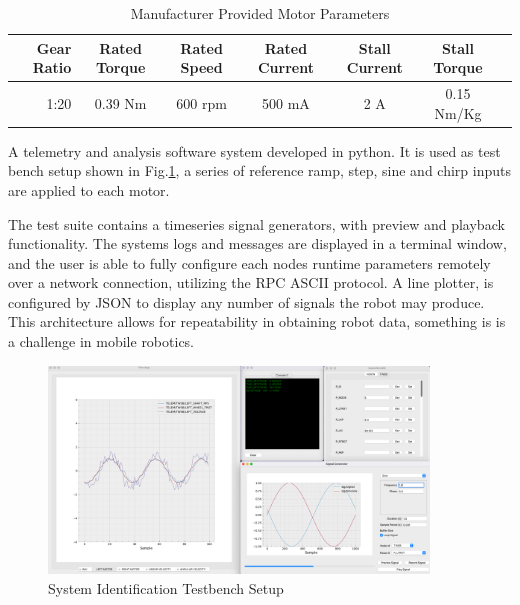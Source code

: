         \begin{table}[H]
            \centering
                \begin{tabular}{|r|c|c|c|c|c|c|}
                    \hline 
                    Gear Ratio & Rated Torque & Rated Speed  & Rated Current & Stall Current & Stall Torque \\
                    \hline
                     1:20  & 0.39 Nm & 600 rpm & 500 mA & 2 A & 0.15 Nm/Kg \\
                    \hline
                \end{tabular}
                \caption{Manufacturer Provided Motor Parameters}
        \end{table}

        A telemetry and analysis software system developed in python. It is used as 
        test bench  setup shown in Fig.\ref{fig:SysIDSetUp}, a series of reference 
        ramp, step, sine and chirp inputs are applied to each motor.
  
        The test suite contains a timeseries signal generators, with preview and playback functionality.
        The systems logs and messages are displayed in a terminal window, and the user is able to fully configure 
        each nodes runtime parameters remotely over a network connection, utilizing the RPC ASCII protocol.
        A line plotter, is configured by JSON to display any number of signals the robot may produce.
        This architecture allows for repeatability in obtaining robot data, something 
        is is a challenge in mobile robotics.
       
        \begin{figure}[H]
            \centering
            \includegraphics[width=0.9\textwidth]{SysIDMotorSetUp.png}
            \caption{System Identification Testbench Setup}
            \label{fig:SysIDSetUp}
        \end{figure}
      
